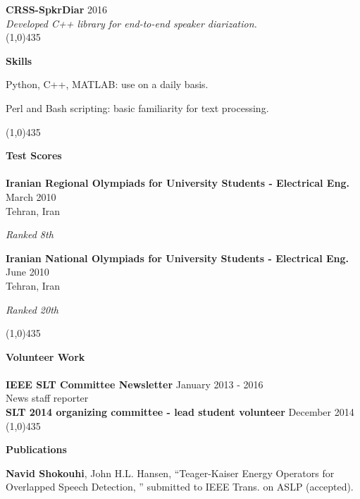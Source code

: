 	{\bf CRSS-SpkrDiar} \hfill { 2016}\\
	{\it Developed C++ library for end-to-end speaker diarization.}\\
	\line(1,0){435}
	
	\textbf{\sc Skills\\} 
	\begin{list2}
		\item Python, C++, MATLAB: use on a daily basis.
		\item Perl and Bash scripting: basic familiarity for text processing.
	\end{list2}
	\vspace{0mm}
	\line(1,0){435}
	
	\textbf{\sc Test Scores\\\\}
	{\bf Iranian Regional Olympiads for University Students - Electrical Eng.} \hfill {March 2010}\\
	Tehran, Iran
	\begin{list1}
	\item[] {\it Ranked 8th}
	\end{list1}
	\vspace{-0mm}
	{\bf Iranian National Olympiads for University Students - Electrical Eng.} \hfill {June 2010}\\
	Tehran, Iran
	\begin{list1}
	\vspace{-0mm}
	\item[] {\it Ranked 20th}
	\end{list1}
	\line(1,0){435}
	\vspace{0mm}
	
	\textbf{\sc Volunteer Work\\\\}
	\vspace{0mm}
	{\bf IEEE SLT Committee Newsletter} \hfill {January 2013 - 2016}\\
	News staff reporter\\
	
	{\bf SLT 2014 organizing committee - lead student volunteer} \hfill {December 2014}\\
	\vspace{0mm}
	\line(1,0){435}
	
	\textbf{\sc Publications\\}
	
	{\bf Navid Shokouhi}, John H.L. Hansen, ``Teager-Kaiser Energy Operators for Overlapped Speech Detection, '' submitted to IEEE Trans. on ASLP (accepted). \\
	
